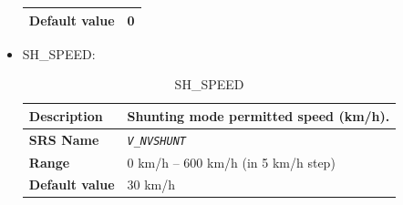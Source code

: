 \documentclass{template/openetcs}
\begin{document}
\begin{itemize}
\begin{longtable}{|l|l|}
				\hline
										
					\begin{minipage}[t]{0.22\linewidth} \textbf{Default value}	\end{minipage} 
				&	\begin{minipage}[t]{0.78\linewidth} 0 \end{minipage} \\
				
				\hline
				
			\end{longtable}
			
			
		\item SH\_SPEED:
			\begin{longtable}{|l|l|}
				\caption{SH\_SPEED}\\ 				
				\hline
				
					\begin{minipage}[t]{0.22\linewidth} \textbf{Description}	\end{minipage} 
				&	\begin{minipage}[t]{0.78\linewidth} Shunting mode permitted speed (km/h). \end{minipage} \\
				
				\hline
				
					\begin{minipage}[t]{0.22\linewidth} \textbf{SRS Name}	\end{minipage} 
				&	\begin{minipage}[t]{0.78\linewidth} \emph{\texttt{V\_NVSHUNT}} \end{minipage} \\
				
				\hline
														
					\begin{minipage}[t]{0.22\linewidth} \textbf{Range}	\end{minipage} 
				&	\begin{minipage}[t]{0.78\linewidth} 0 km/h – 600 km/h (in 5 km/h step) \end{minipage} \\
				
				\hline
										
					\begin{minipage}[t]{0.22\linewidth} \textbf{Default value}	\end{minipage} 
				&	\begin{minipage}[t]{0.78\linewidth} 30 km/h \end{minipage} \\
				

\end{longtable}
\end{itemize}
\end{document}
